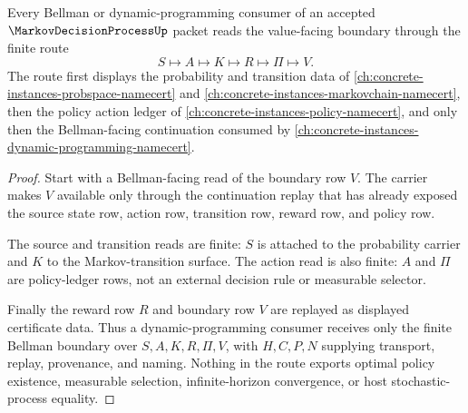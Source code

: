 \begin{theorem}
\label{thm:markov-decision-process-bellman-consumer-boundary}
Every Bellman or dynamic-programming consumer of an accepted $\MarkovDecisionProcessUp$ packet reads the value-facing boundary through the finite route
$$
S\longmapsto A\longmapsto K\longmapsto R\longmapsto \Pi\longmapsto V.
$$
The route first displays the probability and transition data of \autoref{ch:concrete-instances-probspace-namecert} and \autoref{ch:concrete-instances-markovchain-namecert}, then the policy action ledger of \autoref{ch:concrete-instances-policy-namecert}, and only then the Bellman-facing continuation consumed by \autoref{ch:concrete-instances-dynamic-programming-namecert}.
\end{theorem}
\begin{proof}
Start with a Bellman-facing read of the boundary row $V$. The carrier makes $V$ available only through the continuation replay that has already exposed the source state row, action row, transition row, reward row, and policy row.

The source and transition reads are finite: $S$ is attached to the probability carrier and $K$ to the Markov-transition surface. The action read is also finite: $A$ and $\Pi$ are policy-ledger rows, not an external decision rule or measurable selector.

Finally the reward row $R$ and boundary row $V$ are replayed as displayed certificate data. Thus a dynamic-programming consumer receives only the finite Bellman boundary over $S,A,K,R,\Pi,V$, with $H,C,P,N$ supplying transport, replay, provenance, and naming. Nothing in the route exports optimal policy existence, measurable selection, infinite-horizon convergence, or host stochastic-process equality.
\end{proof}

\begin{closurestatus}{\MarkovDecisionProcessUp}
  \theoryclosure{\seedClosure}
  \formalstatus{\unformalizedV}
\end{closurestatus}
